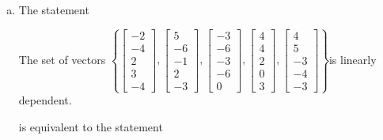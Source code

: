 \begin{exerciseAnswer}
\begin{enumerate}[(a)]
\item The statement 
\begin{center}\begin{minipage}{0.8\textwidth}
 The set of vectors \( \left\{ \left[\begin{array}{c}
-2 \\
-4 \\
2 \\
3 \\
-4
\end{array}\right] , \left[\begin{array}{c}
5 \\
-6 \\
-1 \\
2 \\
-3
\end{array}\right] , \left[\begin{array}{c}
-3 \\
-6 \\
-3 \\
-6 \\
0
\end{array}\right] , \left[\begin{array}{c}
4 \\
4 \\
2 \\
0 \\
3
\end{array}\right] , \left[\begin{array}{c}
4 \\
5 \\
-3 \\
-4 \\
-3
\end{array}\right] \right\} \)is linearly dependent.
\end{minipage}\end{center}
     is equivalent to the statement 
\begin{center}\begin{minipage}{0.8\textwidth}
 The vector equation \( x_{1} \left[\begin{array}{c}
-2 \\
-4 \\
2 \\
3 \\
-4
\end{array}\right] + x_{2} \left[\begin{array}{c}
5 \\
-6 \\

\end{array}
\end{minipage}
\end{center}
\end{enumerate}
\end{exerciseAnswer}
